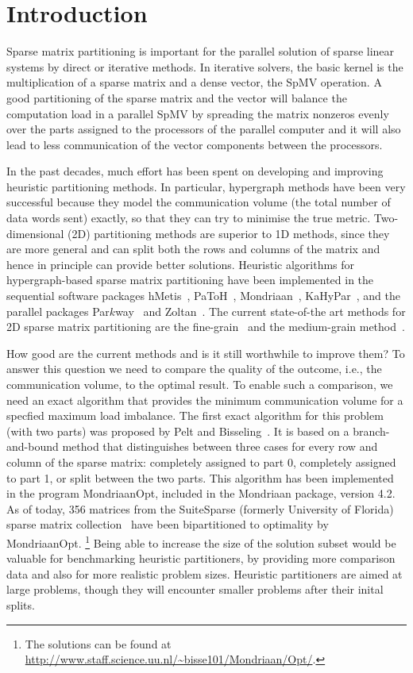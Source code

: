 \section{Introduction}
\label{sec:intro}
Sparse matrix partitioning is important for the parallel solution of sparse linear systems
by direct or iterative methods. In iterative solvers, the basic kernel is the multiplication
of a sparse matrix and a dense vector, the SpMV operation. A good partitioning of the sparse matrix
and the vector will balance the computation load in a parallel SpMV by spreading the
matrix nonzeros evenly over the parts assigned to the processors 
of the parallel computer and it will also
lead to less communication of the vector components between the processors.

In the past decades, much effort has been spent on developing and improving
heuristic partitioning methods. In particular, hypergraph methods have been very
successful because they model the communication volume (the total
number of data words sent) exactly, so that they can try to minimise the true metric.
Two-dimensional (2D) partitioning methods are superior to 1D methods,
since they are more general and can split both the rows and columns of the matrix and
hence in principle can provide better solutions.
Heuristic algorithms for hypergraph-based sparse matrix partitioning
have been implemented in the sequential software packages hMetis~\cite{karypis99b},
PaToH~\cite{catalyurek99}, Mondriaan~\cite{vastenhouw05}, KaHyPar~\cite{akhremtsev17},
and the parallel packages Par$k$way~\cite{trifunovic08} and Zoltan~\cite{devine06}.
The current state-of-the art methods for 2D sparse matrix partitioning are the fine-grain~\cite{catalyurek01}
and the medium-grain method~\cite{pelt14}. 

How good are the current methods and is it still worthwhile to improve them?
To answer this question we need to compare the quality of the outcome,
i.e., the communication volume, to the optimal result.
To enable such a comparison, we need an exact algorithm that provides the 
minimum communication volume for a specfied maximum load imbalance.
The first exact algorithm for this problem (with two parts)
was proposed by Pelt and Bisseling~\cite{pelt15}.
It is based on a branch-and-bound method that distinguishes  between
three cases for every row and column of the sparse matrix:
completely assigned to part 0, completely assigned to part 1, 
or split between the two parts. This algorithm has been implemented
in the program MondriaanOpt, included in the Mondriaan package,
version 4.2. As of today, 356 matrices from the SuiteSparse 
(formerly University of Florida) sparse matrix collection~\cite{davis11}
have been bipartitioned to optimality by MondriaanOpt. 
\footnote{The solutions can be found at
\url{http://www.staff.science.uu.nl/~bisse101/Mondriaan/Opt/}.}
Being able to increase the size of the solution subset would be valuable
for benchmarking heuristic partitioners, by providing more comparison data and also  
for more realistic problem sizes. Heuristic partitioners are aimed at large 
problems, though they will encounter smaller problems after their inital splits.

